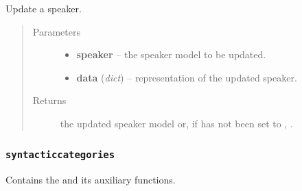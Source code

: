 \documentclass[letterpaper,10pt,english]{sphinxmanual}
\begin{document}

\begin{fulllineitems}
\label{api:onlinelinguisticdatabase.controllers.speakers.updateSpeaker}
Update a speaker.
\begin{quote}\begin{description}
\item[{Parameters}] \leavevmode\begin{itemize}
\item {} 
\textbf{speaker} -- the speaker model to be updated.

\item {} 
\textbf{data} (\emph{dict}) -- representation of the updated speaker.

\end{itemize}

\item[{Returns}] \leavevmode
the updated speaker model or, if  has not been set
to , .

\end{description}\end{quote}

\end{fulllineitems}



\subsubsection{\texttt{syntacticcategories}}
\label{api:module-onlinelinguisticdatabase.controllers.syntacticcategories}\label{api:syntacticcategories}
Contains the {\hyperref[api:onlinelinguisticdatabase.controllers.syntacticcategories.SyntacticcategoriesController]{}} and its auxiliary functions.
\label{api:module-syntacticcategories}
\end{document}
